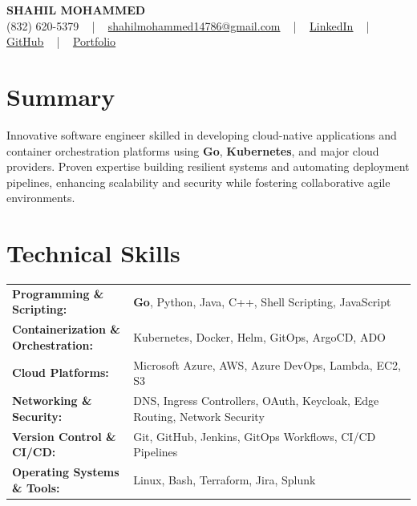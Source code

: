 \documentclass[letterpaper,11pt]{article}
\begin{document}
\begin{center}
    {\fontsize{14pt}{12pt}\selectfont \textbf{\MakeUppercase{Shahil Mohammed}}}\\ \vspace{2pt}
    \fontsize{10pt}{12pt}\selectfont (832) 620-5379 ~ | ~ \href{mailto:shahilmohammed14786@gmail.com}{shahilmohammed14786@gmail.com} ~ | ~  
    \href{https://www.linkedin.com/in/shahil-mohammed-9652931a1/}{\color{blue}\underline{LinkedIn}}  ~ | ~ 
    \href{https://github.com/freakbeast14}{\color{blue}\underline{GitHub}} ~ | ~ 
    \href{https://shahil-mohammed.netlify.app/}{\color{blue}\underline{Portfolio}}
    \vspace{-8pt}
\end{center}

\section{Summary}
\fontsize{9pt}{10pt}\selectfont
Innovative software engineer skilled in developing cloud-native applications and container orchestration platforms using \textbf{Go}, \textbf{Kubernetes}, and major cloud providers. Proven expertise building resilient systems and automating deployment pipelines, enhancing scalability and security while fostering collaborative agile environments.

 \vspace{-5pt}
 
\section{Technical Skills}
        \vspace{-14pt}
        \begin{table}[h]
            \fontsize{9pt}{10pt}\selectfont
            \begin{tabular}{p{0.3\linewidth} p{0.7\linewidth}}
                \textbf{Programming \& Scripting:} & \textbf{Go}, Python, Java, C++, Shell Scripting, JavaScript \\
                \textbf{Containerization \& Orchestration:} & Kubernetes, Docker, Helm, GitOps, ArgoCD, ADO \\
                \textbf{Cloud Platforms:} & Microsoft Azure, AWS, Azure DevOps, Lambda, EC2, S3 \\
                \textbf{Networking \& Security:} & DNS, Ingress Controllers, OAuth, Keycloak, Edge Routing, Network Security \\
                \textbf{Version Control \& CI/CD:} & Git, GitHub, Jenkins, GitOps Workflows, CI/CD Pipelines \\
                \textbf{Operating Systems \& Tools:} & Linux, Bash, Terraform, Jira, Splunk \\
            \end{tabular}
        \end{table}
 \vspace{-15pt}
 
\end{document}
